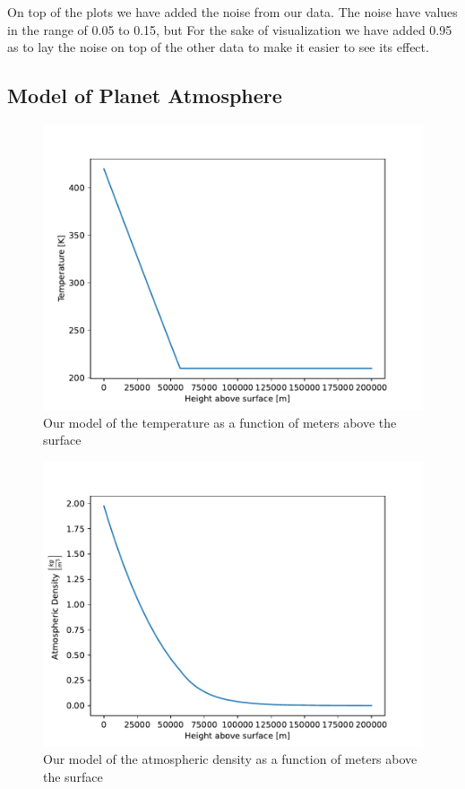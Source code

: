 \documentclass[reprint,english,notitlepage]{revtex4-2}
\begin{document}
On top of the plots we have added the noise from our data. The noise have values in the range of 0.05 to 0.15, but  For the sake of visualization we have added 0.95 as to lay the noise on top of the other data to make it easier to see its effect. 

\subsection{Model of Planet Atmosphere}
\begin{figure}[h!]
  \centering
  \includegraphics[scale = .4]{Figures/Temperature plot.pdf}
  \caption{Our model of the temperature as a function of meters above the surface }
  \label{fig: Temperature}
\end{figure}

\begin{figure}[h!]
  \centering
  \includegraphics[scale = .4]{Figures/Density plot.pdf}
  \caption{Our model of the atmospheric density as a function of meters above the surface }
  \label{fig: Density}
\end{figure}
\end{document}
